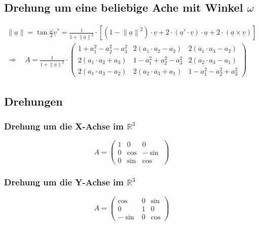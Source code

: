 \subsection{Drehung um eine beliebige Ache mit Winkel $\omega$}
\begin{gather}
  \|\underline{a}\| = \tan{\frac{\omega}{2}}
  \underline{v}^* = \frac{1}{1+{\|\underline{a}\|}^2}\cdot
	\left[{\left({1-{\|\underline{a}\|}^2}\right)\cdot\underline{v}+
	2\cdot (\underline{a}'\cdot\underline{v})\cdot\underline{a}+
	2\cdot (\underline{a}\times\underline{v})}\right] \\
  \Longrightarrow\quad A = \frac{1}{1+{\|\underline{a}\|}^2}\cdot
	\begin{pmatrix}
		1+a_1^2-a_2^2-a_3^2    &  2(a_1\cdot a_2-a_3)  &  2(a_1\cdot a_3 - a_2) \\
		2(a_1\cdot a_2 + a_3)  &  1-a_1^2+a_2^2-a_3^2  &  2(a_2\cdot a_3 - a_1) \\
		2(a_1\cdot a_3 - a_2)  &  2(a_2\cdot a_3+a_1)  &  1-a_1^2-a_2^2+a_3^2
	\end{pmatrix}
\end{gather}


\subsection{Drehungen}

\subsubsection{Drehung um die X-Achse im $\mathbb{R}^3$}
\begin{equation}
  A = \begin{pmatrix}
		1    & 0    & 0     \\
		0    & \cos & -\sin \\
		0    & \sin & \cos
	\end{pmatrix}
\end{equation}

\subsubsection{Drehung um die Y-Achse im $\mathbb{R}^3$}
\begin{equation}
  A = \begin{pmatrix}
		\cos  & 0    & \sin  \\
		0     & 1    & 0     \\
		-\sin & 0    & \cos
	\end{pmatrix}
\end{equation}


